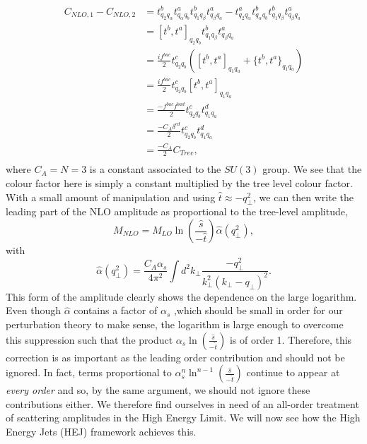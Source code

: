 \begin{equation}
\begin{split}
C_{NLO,1} - C_{NLO,2} &= t^b_{q_2 q_\alpha}t^a_{q_\alpha q_b} t^b_{q_1 q_\beta} t^a_{q_\beta q_a} -  t^a_{q_2 q_\alpha}t^b_{q_\alpha q_b} t^b_{q_1 q_\beta} t^a_{q_\beta q_a}\\
& = [t^b, t^a]_{q_2 q_b} t^b_{q_1 q_\beta} t^a_{q_\beta q_a} \\
&=\frac{if^{bac}}{2}t^c_{q_2 q_b} \left([t^b,t^a]_{q_1 q_a} + \{t^b,t^a\}_{q_1 q_a} \right) \\
&= \frac{if^{bac}}{2}t^c_{q_2 q_b} [t^b,t^a]_{q_1 q_a} \\
&= \frac{-f^{bac}f^{bad}}{2}t^c_{q_2 q_b} t^d_{q_1 q_a} \\
&= \frac{-C_A \delta^{cd}}{2}t^c_{q_2 q_b} t^d_{q_1 q_a} \\
&= \frac{-C_A}{2}C_{Tree}, \\
\end{split}
\end{equation}
where $C_A = N = 3$ is a constant associated to the $SU(3)$ group. We see that the colour factor here is simply a constant multiplied by the tree level colour factor. With a small amount of manipulation and using $\hat{t} \approx -q_\perp^2$, we can then write the leading part of the NLO amplitude as proportional to the tree-level amplitude,
\begin{equation}
M_{NLO} = M_{LO} \ln \left(\frac{\hat{s}}{-\hat{t}}\right) \hat{\alpha}(q_\perp^2),
\end{equation}
with
\begin{equation}
\label{eqn:nlocorr}
\hat{\alpha}(q_\perp^2) = \frac{C_A \alpha_s}{4 \pi^2} \int d^2 k_\perp \frac{-q_\perp^2}{k_\perp^2(k_\perp - q_\perp)^2}.
\end{equation}
This form of the amplitude clearly shows the dependence on the large logarithm. Even though $\hat{\alpha}$ contains a factor of $\alpha_s$ ,which should be small in order for our perturbation theory to make sense, the logarithm is large enough to overcome this suppression such that the product $\alpha_s \ln \left(\frac{\hat{s}}{-\hat{t}}\right)$ is of order 1. Therefore, this correction is as important as the leading order contribution and should not be ignored. In fact, terms proportional to $\alpha_s^n \ln^{n-1} \left(\frac{\hat{s}}{-\hat{t}}\right)$ continue to appear at \emph{every order} \cite{pomeronbook} and so, by the same argument, we should not ignore these contributions either. We therefore find ourselves in need of an all-order treatment of scattering amplitudes in the High Energy Limit. We will now see how the High Energy Jets (HEJ) framework achieves this. 

